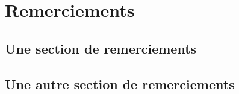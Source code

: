 \chapter{Remerciements}
\section{Une section de remerciements}
\section{Une autre section de remerciements}